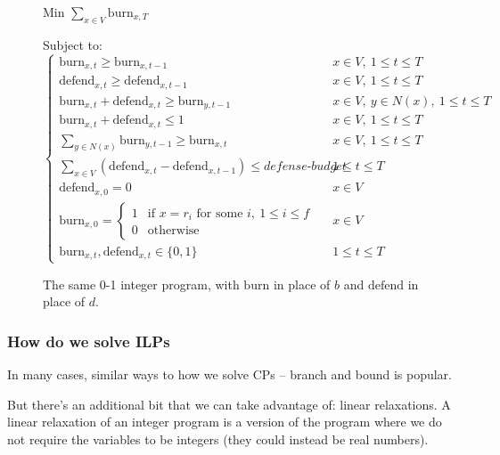 \documentclass[11pt]{article}
\begin{document}
\begin{figure}[H]
    \centering
    \begin{minipage}{0.9\textwidth}
    Min $\displaystyle\sum_{x \in V} \mathrm{burn}_{x,T}$

    \medskip
    Subject to:
    \[
    \begin{cases}
        \mathrm{burn}_{x,t} \geq \mathrm{burn}_{x,t-1} & x \in V,\ 1 \leq t \leq T \\[2pt]
        \mathrm{defend}_{x,t} \geq \mathrm{defend}_{x,t-1} & x \in V,\ 1 \leq t \leq T \\[2pt]
        \mathrm{burn}_{x,t} + \mathrm{defend}_{x,t} \geq \mathrm{burn}_{y,t-1} & x \in V,\ y \in N(x),\ 1 \leq t \leq T \\[2pt]
        \mathrm{burn}_{x,t} + \mathrm{defend}_{x,t} \leq 1 & x \in V,\ 1 \leq t \leq T \\[2pt]
        \displaystyle\sum_{y \in N(x)} \mathrm{burn}_{y,t-1} \geq \mathrm{burn}_{x,t} & x \in V,\ 1 \leq t \leq T \\[6pt]
        \displaystyle\sum_{x \in V} \left(\mathrm{defend}_{x,t} - \mathrm{defend}_{x,t-1}\right) \leq \textit{defense-budget} & 1 \leq t \leq T \\[6pt]
        \mathrm{defend}_{x,0} = 0 & x \in V \\[2pt]
        \mathrm{burn}_{x,0} = \begin{cases} 1 & \text{if } x = r_i \text{ for some } i,\ 1 \leq i \leq f \\ 0 & \text{otherwise} \end{cases} & x \in V \\[2pt]
        \mathrm{burn}_{x,t}, \mathrm{defend}_{x,t} \in \{0, 1\} & 1 \leq t \leq T
    \end{cases}
    \]
    \end{minipage}
    \caption{The same 0-1 integer program, with $\mathrm{burn}$ in place of $b$ and $\mathrm{defend}$ in place of $d$.}
\end{figure}

\subsubsection{How do we solve ILPs}

In many cases, similar ways to how we solve CPs -- branch and bound is popular.

But there's an additional bit that we can take advantage of: linear relaxations. A linear relaxation of an integer program is a version of the program where we do not require the variables to be integers (they could instead be real numbers).
\end{document}
